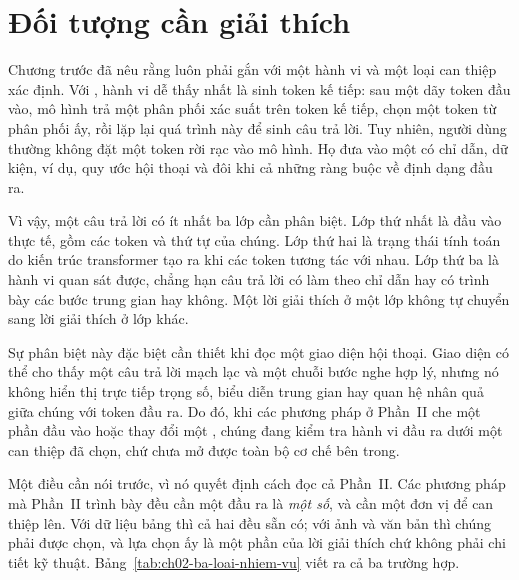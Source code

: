 \section{Đối tượng cần giải thích}
\label{sec:ch02-doi-tuong-can-giai-thich}

%
Chương trước đã nêu rằng  luôn phải gắn với một hành vi và một
loại can thiệp xác định. Với ,
hành vi dễ thấy nhất là sinh token kế tiếp: sau một dãy token đầu vào, mô
hình trả một phân phối xác suất trên token kế tiếp, chọn một token từ phân
phối ấy, rồi lặp lại quá trình này để sinh câu trả lời.
Tuy nhiên, người dùng thường không đặt một token rời rạc vào mô hình. Họ đưa
vào một  có chỉ dẫn, dữ kiện, ví dụ, quy ước hội thoại
và đôi khi cả những ràng buộc về định dạng đầu ra.

Vì vậy, một câu trả lời có ít nhất ba lớp cần phân biệt. Lớp thứ nhất là đầu
vào thực tế, gồm các token và thứ tự của chúng. Lớp thứ hai là trạng thái tính
toán do kiến trúc transformer tạo ra khi các token tương tác với nhau. Lớp thứ
ba là hành vi quan sát được, chẳng hạn câu trả lời có làm theo chỉ dẫn hay có
trình bày các bước trung gian hay không. Một lời giải thích ở một lớp không tự
chuyển sang lời giải thích ở lớp khác.

Sự phân biệt này đặc biệt cần thiết khi đọc một giao diện hội thoại. Giao diện
có thể cho thấy một câu trả lời mạch lạc và một chuỗi bước nghe hợp lý, nhưng
nó không hiển thị trực tiếp trọng số, biểu diễn trung gian hay quan hệ nhân quả
giữa chúng với token đầu ra. Do đó, khi các phương pháp ở Phần~II che một phần đầu vào
hoặc thay đổi một , chúng đang kiểm tra hành vi đầu ra dưới một can
thiệp đã chọn, chứ chưa mở được toàn bộ cơ chế bên trong.

Một điều cần nói trước, vì nó quyết định cách đọc cả Phần~II. Các phương pháp
mà Phần~II trình bày đều cần một đầu ra là \emph{một số}, và cần một đơn vị để
can thiệp lên. Với dữ liệu bảng thì cả hai đều sẵn có; với ảnh và văn bản thì
chúng phải được chọn, và lựa chọn ấy là một phần của lời giải thích chứ không
phải chi tiết kỹ thuật. Bảng~\ref{tab:ch02-ba-loai-nhiem-vu} viết ra cả ba
trường hợp.

